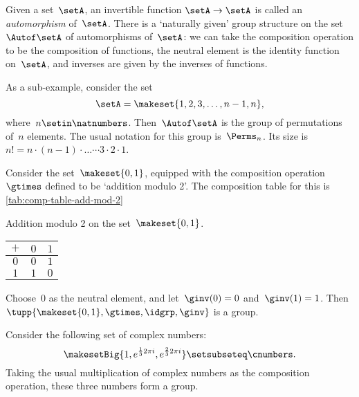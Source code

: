\begin{example}
    Given a set~$\setA$, an invertible function $\setA \to \setA$ is called an \emph{automorphism} of~$\setA$.
    There is a `naturally given' group structure on the set $\Autof\setA$ of automorphisms of~$\setA$:
    we can take the composition operation to be the composition of functions, the neutral element is the identity function on~$\setA$, and inverses are given by the inverses of functions.

    As a sub-example, consider the set
    \begin{equation}
        \setA = \makeset{1, 2, 3, \dots, n-1, n},
    \end{equation}
    where~$n \setin \natnumbers$.
    Then~$\Autof\setA$ is the group of permutations of~$n$ elements.
    The usual notation for this group is~$\Perms_n$.
    Its size is~$n! = n \cdot (n-1) \cdot \dots \cdots 3 \cdot 2 \cdot 1$.

\end{example}

\begin{example}
    \label{exa:grp-order-two}
    Consider the set~$\makeset{ 0, 1 }$, equipped with the composition operation~$\gtimes$ defined to be `addition modulo 2'.
    The composition table for this is \cref{tab:comp-table-add-mod-2}
    \begin{margintable}
        \caption{
            Addition modulo 2 on the set~$\makeset{ 0, 1 }$.
        }
        \label{tab:comp-table-add-mod-2}
        \centering
        \begin{tabular}{c|cc}
            $+$ & $0$ & $1$ \\
            \hline
            $0$ & $0$ & $1$ \\
            $1$ & $1$ & $0$
        \end{tabular}
    \end{margintable}

    Choose~$0$ as the neutral element, and let~$\ginv(0) = 0$ and~$\ginv(1) = 1$.
    Then $\tupp{\makeset{ 0, 1}, \gtimes, \idgrp, \ginv}$ is a group.
\end{example}

\begin{example}
    \label{grp-order-three}
    Consider the following set of complex numbers:
    \begin{equation}
        \makesetBig{ 1, e^{\frac{1}{3}2\pi i}, e^{\frac{2 }{3}2\pi i} } \setsubseteq \cnumbers.
    \end{equation}
    Taking the usual multiplication of complex numbers as the composition operation, these three numbers form a group.
\end{example}

